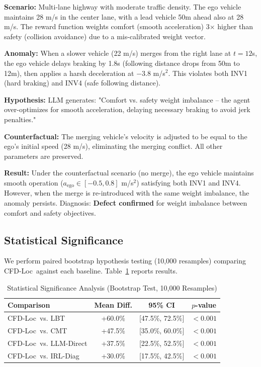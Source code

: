 \documentclass[conference]{IEEEtran}
\theoremstyle{plain}
\newcommand{\methodname}{CFD-Loc}
\begin{document}
\textbf{Scenario:} Multi-lane highway with moderate traffic density. The ego vehicle maintains 28 m/s in the center lane, with a lead vehicle 50m ahead also at 28 m/s. The reward function weights comfort (smooth acceleration) 3$\times$ higher than safety (collision avoidance) due to a mis-calibrated weight vector.

\textbf{Anomaly:} When a slower vehicle (22 m/s) merges from the right lane at $t=12$s, the ego vehicle delays braking by 1.8s (following distance drops from 50m to 12m), then applies a harsh deceleration at $-3.8$ m/s$^2$. This violates both INV1 (hard braking) and INV4 (safe following distance).

\textbf{Hypothesis:} LLM generates: "Comfort vs. safety weight imbalance -- the agent over-optimizes for smooth acceleration, delaying necessary braking to avoid jerk penalties."

\textbf{Counterfactual:} The merging vehicle's velocity is adjusted to be equal to the ego's initial speed (28 m/s), eliminating the merging conflict. All other parameters are preserved.

\textbf{Result:} Under the counterfactual scenario (no merge), the ego vehicle maintains smooth operation ($a_{\text{ego}} \in [-0.5, 0.8]$ m/s$^2$) satisfying both INV1 and INV4. However, when the merge is re-introduced with the same weight imbalance, the anomaly persists. Diagnosis: \textbf{Defect confirmed} for weight imbalance between comfort and safety objectives.

\subsection{Statistical Significance}

We perform paired bootstrap hypothesis testing (10,000 resamples) comparing \methodname\ against each baseline. Table~\ref{tab:stats} reports results.

\begin{table}[h]
\centering
\caption{Statistical Significance Analysis (Bootstrap Test, 10,000 Resamples)}
\label{tab:stats}
\begin{tabular}{lccc}
\toprule
\textbf{Comparison} & \textbf{Mean Diff.} & \textbf{95\% CI} & \textbf{$p$-value} \\
\midrule
\methodname\ vs. LBT & +60.0\% & [47.5\%, 72.5\%] & $<0.001$ \\
\methodname\ vs. CMT & +47.5\% & [35.0\%, 60.0\%] & $<0.001$ \\
\methodname\ vs. LLM-Direct & +37.5\% & [22.5\%, 52.5\%] & $<0.001$ \\
\methodname\ vs. IRL-Diag & +30.0\% & [17.5\%, 42.5\%] & $<0.001$ \\
\bottomrule
\end{tabular}
\end{table}
\end{document}
